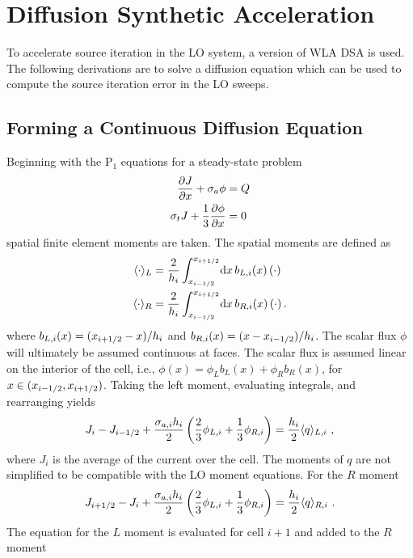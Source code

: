 \section{Diffusion Synthetic Acceleration}

To accelerate source iteration in the LO system, a version of WLA DSA is used.  The
following derivations are to solve a diffusion equation which can be used to compute
the source iteration error in the LO sweeps.

\subsection{Forming a Continuous Diffusion Equation}

Beginning with the P$_1$ equations for a steady-state problem
\begin{align}\label{eq:dsa_bal}
    \frac{\partial J}{\partial x} + \sigma_a \phi &= Q \\ \label{eq:p1}
    \sigma_t J + \frac{1}{3} \frac{\partial \phi}{\partial x} &= 0 \\
\end{align}
spatial finite element moments are taken. The spatial moments are defined as
\begin{align}
    \langle \cdot \rangle_L &= \frac{2}{h_i} \int_{{x_{i-1/2}}}^{{x_{i+1/2}}} \! \mathrm{d} x \,b_{L,i}(x)    \left( \cdot \right) \\
    \langle \cdot \rangle_R &= \frac{2}{h_i} \int_{{x_{i-1/2}}}^{{x_{i+1/2}}} \! \mathrm{d} x \,b_{R,i}(x) \left( \cdot \right).
\end{align}
where $b_{L,i}(x) = ({x_{i+1/2}} - x)/h_i$ and $b_{R,i}(x) = (x - {x_{i-1/2}})/h_i$.
The scalar flux $\phi$ will ultimately be assumed continuous at faces. The scalar
flux is assumed linear on the interior of the cell, i.e.,
$\phi(x)=\phi_Lb_L(x) + \phi_Rb_R(x)$, for $x\in({x_{i-1/2}},{x_{i+1/2}})$.   Taking the left moment,
evaluating integrals, and rearranging yields
\begin{equation}
    J_{i} - J_{{i-1/2}}  + \frac{\sigma_{a,i}h_i}{2} \left(\frac{2}{3} \phi_{L,i} + \frac{1}{3}
    \phi_{R,i} \right) = \frac{h_i}{2} \langle q \rangle_{L,i}\,\,,
\end{equation}
where $J_i$ is the average of the current over the cell. The moments of $q$ are
not simplified to be compatible with the LO moment equations. For the $R$ moment
\begin{equation}
    J_{i+1/2} - J_{i}  + \frac{\sigma_{a,i}h_i}{2} \left(\frac{2}{3} \phi_{L,i} + \frac{1}{3}
    \phi_{R,i} \right) = \frac{h_i}{2} \langle q \rangle_{R,i}\,\,.
\end{equation}
The equation for the $L$ moment is evaluated for cell $i+1$ and added to the $R$ moment
